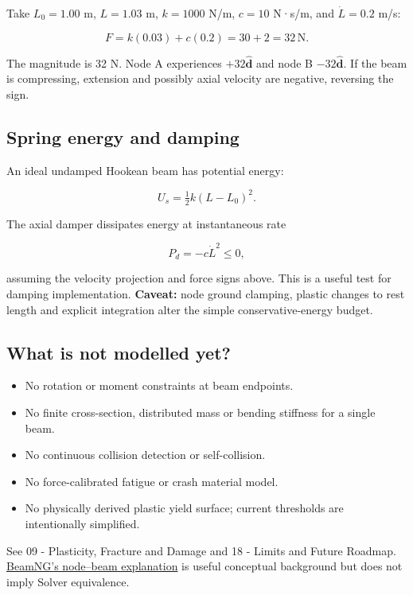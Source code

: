 \documentclass[
  10pt,
  a4paper,
]{article}
\providecommand{\tightlist}{%
  \setlength{\itemsep}{0pt}\setlength{\parskip}{0pt}}
\begin{document}
Take \(L_0=1.00\) m, \(L=1.03\) m, \(k=1000\) N/m, \(c=10\) N·s/m, and
\(\dot L=0.2\) m/s:

\[F=k(0.03)+c(0.2)=30+2=32\,\mathrm N.\]

The magnitude is 32 N. Node A experiences \(+32\hat{\mathbf d}\) and
node B \(-32\hat{\mathbf d}\). If the beam is compressing, extension and
possibly axial velocity are negative, reversing the sign.

\subsection{Spring energy and damping}\label{spring-energy-and-damping}

An ideal undamped Hookean beam has potential energy:

\[U_s=\tfrac12 k(L-L_0)^2.\]

The axial damper dissipates energy at instantaneous rate

\[P_{d}=-c\dot L^2\le 0,\]

assuming the velocity projection and force signs above. This is a useful
test for damping implementation. \textbf{Caveat:} node ground clamping,
plastic changes to rest length and explicit integration alter the simple
conservative-energy budget.

\subsection{What is not modelled yet?}\label{what-is-not-modelled-yet}

\begin{itemize}
\tightlist
\item
  No rotation or moment constraints at beam endpoints.
\item
  No finite cross-section, distributed mass or bending stiffness for a
  single beam.
\item
  No continuous collision detection or self-collision.
\item
  No force-calibrated fatigue or crash material model.
\item
  No physically derived plastic yield surface; current thresholds are
  intentionally simplified.
\end{itemize}

See 09 - Plasticity, Fracture and Damage and 18 - Limits and Future
Roadmap. \href{https://www.beamng.com/game/about/physics/}{BeamNG's
node--beam explanation} is useful conceptual background but does not
imply Solver equivalence.
\end{document}

